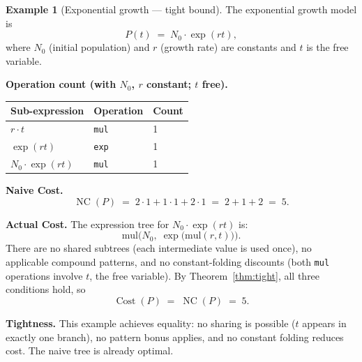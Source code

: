 \documentclass[12pt,a4paper]{article}
\theoremstyle{definition}
\newtheorem{example}[theorem]{Example}
\newcommand{\NC}{\operatorname{NC}}
\newcommand{\Cost}{\operatorname{Cost}}
\begin{document}
\begin{example}[Exponential growth --- tight bound]
\label{ex:expgrowth}
The exponential growth model is
\[
  P(t) \;=\; N_0 \cdot \exp(r t),
\]
where $N_0$ (initial population) and $r$ (growth rate) are constants and
$t$ is the free variable.

\smallskip
\noindent\textbf{Operation count (with $N_0$, $r$ constant; $t$ free).}

\begin{center}
\begin{tabular}{@{}lll@{}}
\toprule
Sub-expression & Operation & Count \\
\midrule
$r \cdot t$          & \texttt{mul} & 1 \\
$\exp(rt)$           & \texttt{exp} & 1 \\
$N_0 \cdot \exp(rt)$ & \texttt{mul} & 1 \\
\bottomrule
\end{tabular}
\end{center}

\noindent\textbf{Naive Cost.}
\[
  \NC(P) \;=\; 2 \cdot 1 + 1 \cdot 1 + 2 \cdot 1
           \;=\; 2 + 1 + 2 \;=\; 5.
\]

\noindent\textbf{Actual Cost.}
The expression tree for $N_0 \cdot \exp(rt)$ is:
\[
  \text{mul}\bigl(N_0,\; \exp\bigl(\text{mul}(r, t)\bigr)\bigr).
\]
There are no shared subtrees (each intermediate value is used once),
no applicable compound patterns, and no constant-folding discounts
(both \texttt{mul} operations involve $t$, the free variable).
By Theorem~\ref{thm:tight}, all three conditions hold, so
\[
  \Cost(P) \;=\; \NC(P) \;=\; 5.
\]

\smallskip
\noindent\textbf{Tightness.}
This example achieves equality: no sharing is possible ($t$ appears in
exactly one branch), no pattern bonus applies, and no constant folding
reduces cost.
The naive tree is already optimal.
\end{example}
\end{document}
